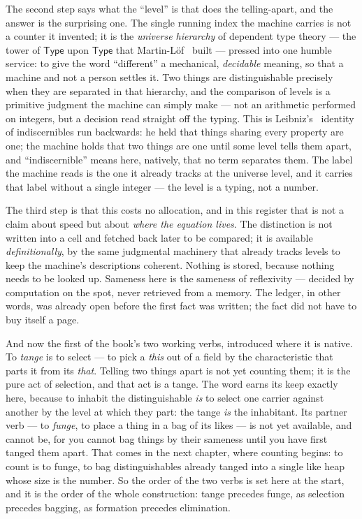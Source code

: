 The second step says what the ``level'' is that does the telling-apart, and the answer is the surprising one. The
single running index the machine carries is not a counter it invented; it is the \emph{universe hierarchy} of
dependent type theory --- the tower of \(\mathsf{Type}\) upon \(\mathsf{Type}\) that Martin-L\"of~\cite{martin1970}
built --- pressed into one humble service: to give the word ``different'' a mechanical, \emph{decidable} meaning, so
that a machine and not a person settles it. Two things are distinguishable precisely when they are separated in that
hierarchy, and the comparison of levels is a primitive judgment the machine can simply make --- not an arithmetic
performed on integers, but a decision read straight off the typing. This is Leibniz's~\cite{leibniz1686} identity of
indiscernibles run backwards: he held that things sharing every property are one; the machine holds that two things
are one until some level tells them apart, and ``indiscernible'' means here, natively, that no term separates them.
The label the machine reads is the one it already tracks at the universe level, and it carries that label without a
single integer --- the level is a typing, not a number.

The third step is that this costs no allocation, and in this register that is not a claim about speed but about
\emph{where the equation lives}. The distinction is not written into a cell and fetched back later to be compared; it
is available \emph{definitionally}, by the same judgmental machinery that already tracks levels to keep the machine's
descriptions coherent. Nothing is stored, because nothing needs to be looked up. Sameness here is the sameness of
reflexivity --- decided by computation on the spot, never retrieved from a memory. The ledger, in other words, was
already open before the first fact was written; the fact did not have to buy itself a page.

And now the first of the book's two working verbs, introduced where it is native. To \emph{tange} is to select --- to
pick a \emph{this} out of a field by the characteristic that parts it from its \emph{that}. Telling two things apart
is not yet counting them; it is the pure act of selection, and that act is a tange. The word earns its keep exactly
here, because to inhabit the distinguishable \emph{is} to select one carrier against another by the level at which
they part: the tange \emph{is} the inhabitant. Its partner verb --- to \emph{funge}, to place a thing in a bag of its
likes --- is not yet available, and cannot be, for you cannot bag things by their sameness until you have first tanged
them apart. That comes in the next chapter, where counting begins: to count is to funge, to bag distinguishables
already tanged into a single like heap whose size is the number. So the order of the two verbs is set here at the
start, and it is the order of the whole construction: tange precedes funge, as selection precedes bagging, as
formation precedes elimination.

